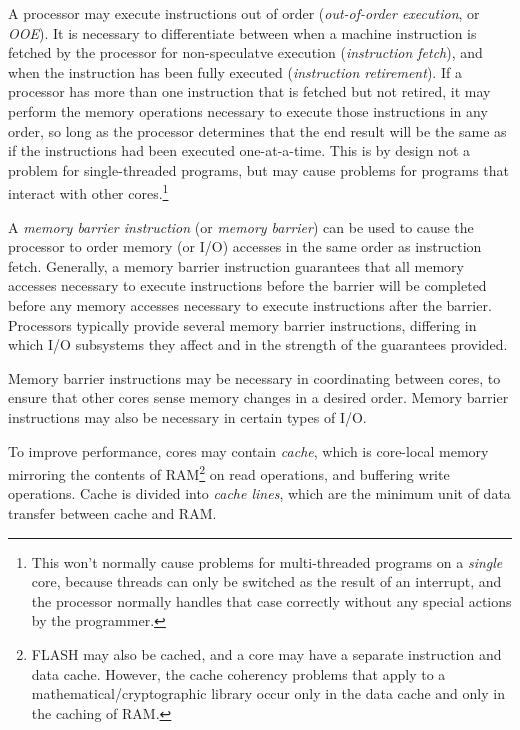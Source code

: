 A processor may execute instructions out of order 
(\emph{out-of-order 
execution}, or \emph{OOE})\@.  
It is necessary to differentiate between when a machine 
instruction is fetched by the processor for non-speculatve 
execution (\emph{instruction 
fetch}), and when the instruction has been fully executed 
(\emph{instruction 
retirement}).  If a processor has more than one instruction 
that is fetched but not retired, it may perform the memory 
operations necessary to execute those 
instructions in any order, so long as the processor 
determines that the end result will be the same as if the 
instructions had been executed one-at-a-time.  This is by 
design not a problem for single-threaded programs, but may 
cause problems for programs that interact with other 
cores.\footnote{This won't normally cause problems for 
multi-threaded programs on a \emph{single} core, because
threads can only be switched as the result of an interrupt, 
and the processor normally handles that case correctly 
without any special actions by the programmer.} 

A \emph{memory barrier instruction} 
(or \emph{memory barrier}) can be used to cause the 
processor to order memory (or I/O) accesses in the same 
order as instruction fetch.  Generally, a memory barrier 
instruction guarantees that all memory accesses necessary to 
execute instructions before the barrier will be completed 
before any memory accesses necessary to execute instructions 
after the barrier.  Processors typically provide several 
memory barrier instructions, differing in which I/O 
subsystems they affect and in the strength of the guarantees 
provided.  

Memory barrier instructions may be necessary in coordinating 
between cores, to ensure that other cores sense memory 
changes in a desired order.  Memory barrier instructions may 
also be necessary in certain types of I/O.  

To improve performance, cores may contain 
\emph{cache}, which is core-local memory 
mirroring the contents of RAM\footnote{FLASH may also be 
cached, and a core may have a separate instruction and data 
cache.  However, the cache coherency problems that apply to 
a mathematical/cryptographic library occur only in the data 
cache and only in the caching of RAM.} on read operations, 
and buffering write operations.  Cache is divided into 
\emph{cache lines}, which are the minimum 
unit of data transfer between cache and RAM.  

